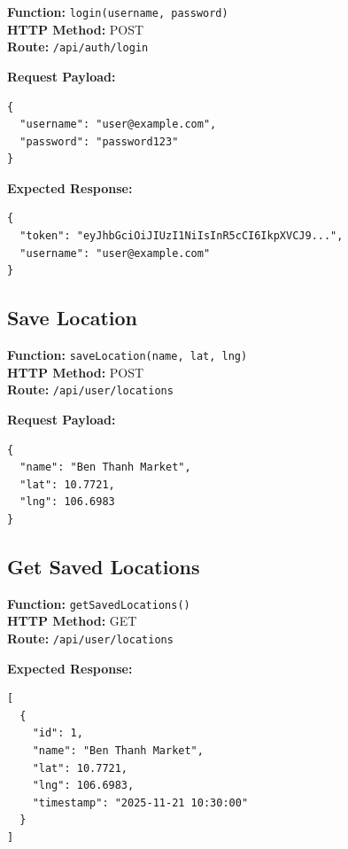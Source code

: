 \textbf{Function:} \texttt{login(username, password)}\\
\textbf{HTTP Method:} POST\\
\textbf{Route:} \texttt{/api/auth/login}

\textbf{Request Payload:}
\begin{tcolorbox}[colback=gray!10,colframe=black!50,arc=2mm]
\begin{verbatim}
{
  "username": "user@example.com",
  "password": "password123"
}
\end{verbatim}
\end{tcolorbox}

\textbf{Expected Response:}
\begin{tcolorbox}[colback=gray!10,colframe=black!50,arc=2mm]
\begin{verbatim}
{
  "token": "eyJhbGciOiJIUzI1NiIsInR5cCI6IkpXVCJ9...",
  "username": "user@example.com"
}
\end{verbatim}
\end{tcolorbox}

\subsection{Save Location}

\textbf{Function:} \texttt{saveLocation(name, lat, lng)}\\
\textbf{HTTP Method:} POST\\
\textbf{Route:} \texttt{/api/user/locations}

\textbf{Request Payload:}
\begin{tcolorbox}[colback=gray!10,colframe=black!50,arc=2mm]
\begin{verbatim}
{
  "name": "Ben Thanh Market",
  "lat": 10.7721,
  "lng": 106.6983
}
\end{verbatim}
\end{tcolorbox}

\subsection{Get Saved Locations}

\textbf{Function:} \texttt{getSavedLocations()}\\
\textbf{HTTP Method:} GET\\
\textbf{Route:} \texttt{/api/user/locations}

\textbf{Expected Response:}
\begin{tcolorbox}[colback=gray!10,colframe=black!50,arc=2mm]
\begin{verbatim}
[
  {
    "id": 1,
    "name": "Ben Thanh Market",
    "lat": 10.7721,
    "lng": 106.6983,
    "timestamp": "2025-11-21 10:30:00"
  }
]
\end{verbatim}
\end{tcolorbox}

